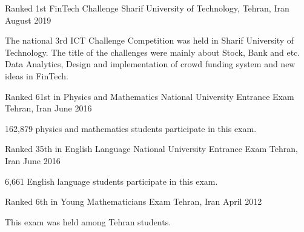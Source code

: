 \begin{cventries}
	
  \cventry
	{}
	{Ranked 1st FinTech Challenge}
	{Sharif University of Technology, Tehran, Iran}
	{August 2019}
	{
		\begin{cvitems}
			{
				The national 3rd ICT Challenge Competition was held in Sharif University of Technology. The title of the challenges were mainly about Stock, Bank and etc. Data Analytics, Design and implementation of crowd funding system and new ideas in FinTech.
			}
		\end{cvitems}
	}
  \cventry
    {}
    {Ranked 61st in Physics and Mathematics National University Entrance Exam}
    {Tehran, Iran}
    {June 2016}
    {
      \begin{cvitems}
        {162,879 physics and mathematics students participate in this exam. }
      \end{cvitems}
    }
    \cventry
    {}
    {Ranked 35th in English Language National University Entrance Exam}
    {Tehran, Iran}
    {June 2016}
    {
      \begin{cvitems}
         {6,661 English language students participate in this exam. }
      \end{cvitems}
    }
  \cventry
    {}
    {Ranked 6th in Young Mathematicians Exam}
    {Tehran, Iran}
    {April 2012}
    {
      \begin{cvitems}
         {This exam was held among Tehran students. }
      \end{cvitems}
    }
\end{cventries}
